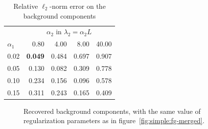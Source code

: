     \vfill

    \begin{table}[b]
        \centering
        \begin{tabular}{l|rrrr}
            \toprule
             & \multicolumn{4}{c}{$\alpha_2$ in $\lambda_2 = \alpha_2 L$} \\
            \cmidrule(lr){2-5}
            $\alpha_1$ & 0.80 & 4.00 & 8.00 & 40.00 \\
            \midrule
            0.02 & \textbf{0.049} & 0.484 & 0.697 & 0.907 \\
            0.05 & 0.130 & 0.082 & 0.309 & 0.778 \\
            0.10 & 0.234 & 0.156 & 0.096 & 0.578 \\
            0.15 & 0.311 & 0.243 & 0.165 & 0.409 \\
            \bottomrule
        \end{tabular}
        \caption{Relative $\ell_2$-norm error on the background components \label{tab:rl2-bg}}
    \end{table}

    \vfill

    \begin{figure}[p]
        \caption{Recovered background components, with the same value of regularization parameters as in figure~\ref{fig:simple:fg-merged}.}
        \label{fig:simple:bg}        
    \end{figure}


